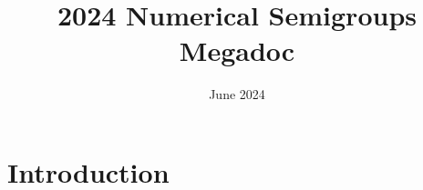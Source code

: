 \documentclass{article}
\title{2024 Numerical Semigroups Megadoc}
\date{June 2024}
\begin{document}
\maketitle

\section{Introduction}
\end{document}
